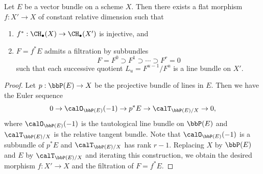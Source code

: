  \begin{lemma}\label{thm:splitting_principle}
    Let $E$ be a vector bundle on a scheme $X$.
    Then there exists a flat morphism $f: X' \to X$ of constant relative dimension such that 
    \begin{enumerate}
      \item $f^*: \CH_\bullet(X) \to \CH_{\bullet} (X')$ is injective, and
      \item $F = f^* E$ admits a filtration by subbundles 
        \[ F = F^0 \supset F^1 \supset \cdots \supset F^r = 0 \]
        such that each successive quotient $L_u = F^{u-1} / F^u$ is a line bundle on $X'$.
    \end{enumerate}
  \end{lemma}
  \begin{proof}
    Let $p: \bbP(E) \to X$ be the projective bundle of lines in $E$.
    Then we have the Euler sequence
    \[ 0 \to \calO_{\bbP(E)}(-1) \to p^* E \to \calT_{\bbP(E)/X} \to 0, \]
    where $\calO_{\bbP(E)}(-1)$ is the tautological line bundle on $\bbP(E)$ and $\calT_{\bbP(E)/X}$ is the relative tangent bundle.
    Note that $\calO_{\bbP(E)}(-1)$ is a subbundle of $p^* E$ and $\calT_{\bbP(E)/X}$ has rank $r-1$.
    Replacing $X$ by $\bbP(E)$ and $E$ by $\calT_{\bbP(E)/X}$ and iterating this construction, we obtain the desired morphism $f: X' \to X$ and the filtration of $F = f^* E$.
  \end{proof}

